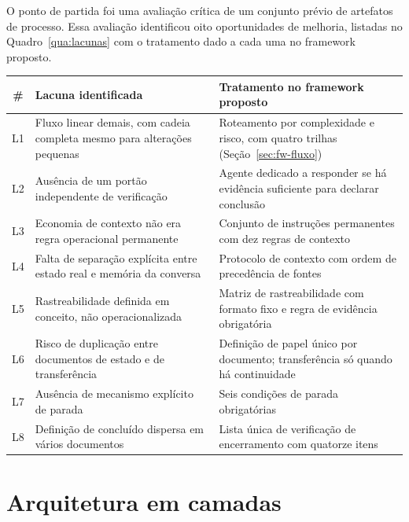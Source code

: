 O ponto de partida foi uma avaliação crítica de um conjunto prévio de artefatos
de processo. Essa avaliação identificou oito oportunidades de melhoria, listadas
no Quadro~\ref{qua:lacunas} com o tratamento dado a cada uma no framework
proposto.

\begin{quadro}[htb]
	\caption{Lacunas identificadas no material de origem e tratamento no framework}
	\label{qua:lacunas}
	\centering
	\footnotesize
	\begin{tabularx}{\textwidth}{@{}c p{5.4cm} X@{}}
		\toprule
		\textbf{\#} & \textbf{Lacuna identificada} & \textbf{Tratamento no framework proposto} \\
		\midrule
		L1 & Fluxo linear demais, com cadeia completa mesmo para alterações pequenas & Roteamento por complexidade e risco, com quatro trilhas (Seção~\ref{sec:fw-fluxo}) \\
		\addlinespace
		L2 & Ausência de um portão independente de verificação & Agente dedicado a responder se há evidência suficiente para declarar conclusão \\
		\addlinespace
		L3 & Economia de contexto não era regra operacional permanente & Conjunto de instruções permanentes com dez regras de contexto \\
		\addlinespace
		L4 & Falta de separação explícita entre estado real e memória da conversa & Protocolo de contexto com ordem de precedência de fontes \\
		\addlinespace
		L5 & Rastreabilidade definida em conceito, não operacionalizada & Matriz de rastreabilidade com formato fixo e regra de evidência obrigatória \\
		\addlinespace
		L6 & Risco de duplicação entre documentos de estado e de transferência & Definição de papel único por documento; transferência só quando há continuidade \\
		\addlinespace
		L7 & Ausência de mecanismo explícito de parada & Seis condições de parada obrigatórias \\
		\addlinespace
		L8 & Definição de concluído dispersa em vários documentos & Lista única de verificação de encerramento com quatorze itens \\
		\bottomrule
	\end{tabularx}
\end{quadro}

\section{Arquitetura em camadas}
\label{sec:fw-camadas}

